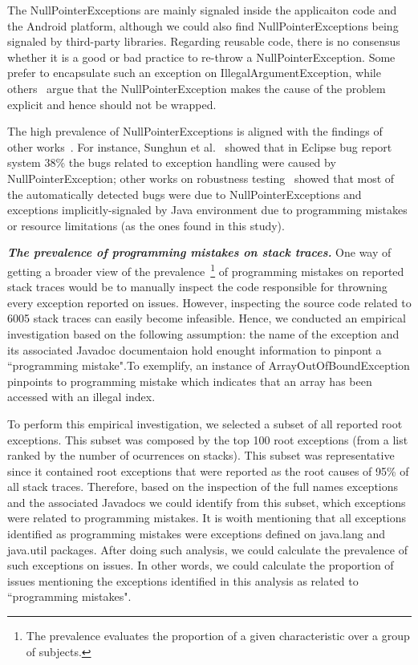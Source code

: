 \documentclass[conference]{IEEEtran}
\begin{document}
 The NullPointerExceptions are mainly signaled inside the applicaiton code and the Android platform,
 although we could also find NullPointerExceptions being signaled by third-party libraries. 
Regarding reusable code, there is no consensus whether it is a good or bad practice to 
re-throw a NullPointerException. Some prefer to encapsulate such an exception on
IllegalArgumentException, while others~\cite{bloch2008effective} argue that the
NullPointerException makes the cause of the problem explicit and hence 
should not be wrapped.

The high prevalence of NullPointerExceptions is aligned with the findings of other 
works~\cite{kim2013predicting,fraser20131600,csallner2004jcrasher}. For instance, Sunghun et
al.~\cite{kim2013predicting} showed that in Eclipse bug report system 38\% the bugs 
related to exception handling were caused by NullPointerException; other works on robustness 
testing~\cite{maji2012empirical,csallner2004jcrasher} showed that most of the automatically 
detected bugs were due to NullPointerExceptions and exceptions implicitly-signaled by Java 
environment due to programming mistakes or resource limitations
 (as the ones found in this study).

\emph{\textbf{The prevalence of programming mistakes on stack traces.}} One way of getting a broader view of the prevalence~\footnote{The prevalence evaluates the proportion of a given characteristic over a group of subjects.}  of programming mistakes on reported stack traces would be to manually inspect the code responsible for throwning every exception reported  on issues. However, inspecting the source code related to 6005 stack traces can easily become infeasible.
Hence, we conducted an empirical investigation based on the following assumption: the name of the exception and its associated Javadoc 
documentaion hold enought information to pinpont a ``programming mistake".To exemplify, an instance of ArrayOutOfBoundException
 pinpoints to programming mistake which indicates that an array has been accessed with an illegal index.

To perform this empirical investigation, we selected a subset of all reported root exceptions. 
This subset was composed by the top 100 root exceptions (from a list ranked by the number of ocurrences on stacks).
This subset was representative since it contained root exceptions that were reported as the root causes of 95\% of 
all stack traces. Therefore, based on the inspection of the full names exceptions and the associated 
 Javadocs we could identify from this subset, which exceptions were related to programming mistakes.
 It is woith mentioning that  all exceptions identified as programming mistakes were exceptions defined on java.lang and java.util packages. 
After doing such analysis, we could calculate the prevalence of such exceptions on issues. In other words, we could calculate the proportion of issues mentioning the exceptions identified in this analysis as related to ``programming mistakes".
\end{document}
